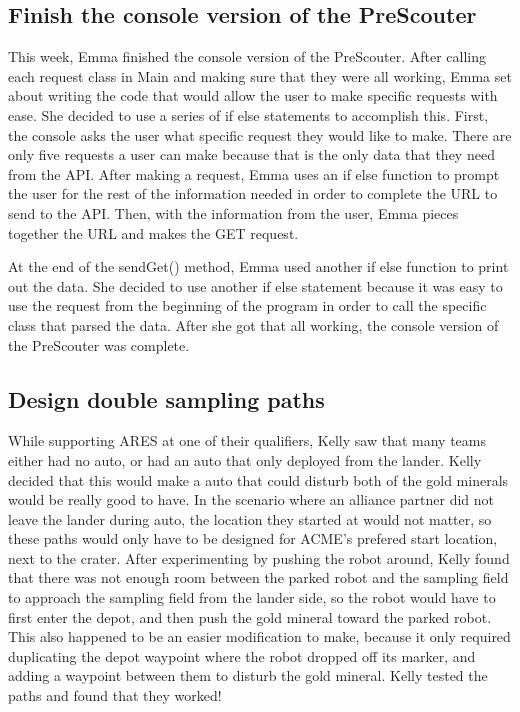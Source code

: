 \documentclass{article}
\begin{document}
\subsection{Finish the console version of the PreScouter}
This week, Emma finished the console version of the PreScouter. After calling each request class in Main and making sure that they were all working, Emma set about writing the code that would allow the user to make specific requests with ease. She decided to use a series of if else statements to accomplish this. First, the console asks the user what specific request they would like to make. There are only five requests a user can make because that is the only data that they need from the API. After making a request, Emma uses an if else function to prompt the user for the rest of the information needed in order to complete the URL to send to the API. Then, with the information from the user, Emma pieces together the URL and makes the GET request.

At the end of the sendGet() method, Emma used another if else function to print out the data. She decided to use another if else statement because it was easy to use the request from the beginning of the program in order to call the specific class that parsed the data. After she got that all working, the console version of the PreScouter was complete. 


\subsection {Design double sampling paths}
While supporting ARES at one of their qualifiers, Kelly saw that many teams either had no auto, or had an auto that only deployed from the lander. Kelly decided that this would make a auto that could disturb both of the gold minerals would be really good to have. In the scenario where an alliance partner did not leave the lander during auto, the location they started at would not matter, so these paths would only have to be designed for ACME's prefered start location, next to the crater. After experimenting by pushing the robot around, Kelly found that there was not enough room between the parked robot and the sampling field to approach the sampling field from the lander side, so the robot would have to first enter the depot, and then push the gold mineral toward the parked robot. This also happened to be an easier modification to make, because it only required duplicating the depot waypoint where the robot dropped off its marker, and adding a waypoint between them to disturb the gold mineral. Kelly tested the paths and found that they worked!
\end{document}
